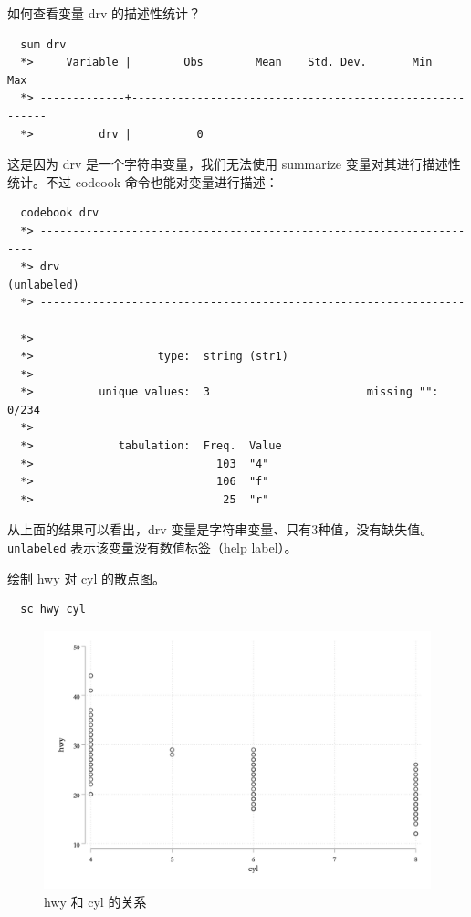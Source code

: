 \begin{exercise}
  如何查看变量 drv 的描述性统计？
\end{exercise}

\begin{solution}
  \begin{lstlisting}
  sum drv
  *>     Variable |        Obs        Mean    Std. Dev.       Min        Max
  *> -------------+---------------------------------------------------------
  *>          drv |          0
  \end{lstlisting}

  这是因为 drv 是一个字符串变量，我们无法使用 summarize 变量对其进行描述性统计。不过 codeook 命令也能对变量进行描述：

  \begin{lstlisting}
  codebook drv
  *> ---------------------------------------------------------------------
  *> drv                                                       (unlabeled)
  *> ---------------------------------------------------------------------
  *>
  *>                   type:  string (str1)
  *>
  *>          unique values:  3                        missing "":  0/234
  *>
  *>             tabulation:  Freq.  Value
  *>                            103  "4"
  *>                            106  "f"
  *>                             25  "r"
  \end{lstlisting}

  从上面的结果可以看出，drv 变量是字符串变量、只有3种值，没有缺失值。\texttt{unlabeled} 表示该变量没有数值标签（help label）。
\end{solution}

\begin{exercise}
  绘制 hwy 对 cyl 的散点图。
\end{exercise}

\begin{solution}
  \begin{lstlisting}
  sc hwy cyl
  \end{lstlisting}

  \begin{figure}[htbp]
    \centering
    \includegraphics[width=\textwidth]{assets/hwycyl.png}
    \caption{hwy 和 cyl 的关系}
    \label{fig:hwycyl}
  \end{figure}
\end{solution}


